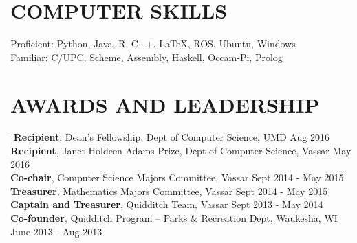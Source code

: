 \documentclass{res}
\begin{document}
\begin{resume}
{  \vspace{-1pt}
  \section{\hspace{0.2in}COMPUTER SKILLS}
    \vspace{3pt}
      Proficient: Python, Java, R, C++, LaTeX, ROS, Ubuntu, Windows\\
      Familiar: C/UPC, Scheme, Assembly, Haskell, Occam-Pi, Prolog\\

  \vspace{-16pt}
  \section{\hspace{0.2in}AWARDS AND LEADERSHIP}
    \vspace{-3pt}
    \begin{tabbing}
      \hspace{5.65in}\=  \kill %
      {\bf Recipient}, Dean's Fellowship, Dept of Computer Science, UMD\>
          Aug 2016\\
      {\bf Recipient}, Janet Holdeen-Adams Prize, Dept of Computer Science, Vassar\>
          May 2016\\
      {\bf Co-chair}, Computer Science Majors Committee, Vassar\>
          Sept 2014 - May 2015\\
      {\bf Treasurer}, Mathematics Majors Committee, Vassar\>
          Sept 2014 - May 2015\\
      {\bf Captain and Treasurer}, Quidditch Team, Vassar\>
          Sept 2013 - May 2014\\
      {\bf Co-founder}, Quidditch Program -- Parks \& Recreation Dept, Waukesha, WI\>
           June 2013 - Aug 2013\\
    \end{tabbing}
} %
\end{resume}
\end{document}
